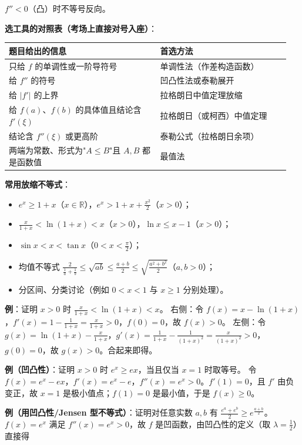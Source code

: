 \documentclass[11pt,openany,UTF8]{ctexbook}
\begin{document}
$f''<0$（凸）时不等号反向。

\textbf{选工具的对照表（考场上直接对号入座）}：

\begingroup\small\setlength{\tabcolsep}{4.0pt}
\begin{longtable}{@{}L{0.5058\linewidth}L{0.4399\linewidth}@{}}
\toprule
\textbf{题目给出的信息} & \textbf{首选方法} \\
\midrule
\endhead
只给 $f$ 的单调性或一阶导符号 & 单调性法（作差构造函数） \\
给 $f''$ 的符号 & 凹凸性法或泰勒展开 \\
给 $\vert f'\vert$ 的上界 & 拉格朗日中值定理放缩 \\
给 $f(a)$、$f(b)$ 的具体值且结论含 $f'(\xi)$ & 拉格朗日（或柯西）中值定理 \\
结论含 $f''(\xi)$ 或更高阶 & 泰勒公式（拉格朗日余项） \\
两端为常数、形式为"$A\le B$"且 $A,B$ 都是函数值 & 最值法 \\
\bottomrule
\end{longtable}
\endgroup

\textbf{常用放缩不等式}：

\begin{itemize}
\item $e^x\ge 1+x$（$x\in\mathbb R$），$e^x>1+x+\frac{x^2}{2}$（$x>0$）；
\item $\frac{x}{1+x}<\ln(1+x)<x$（$x>0$），$\ln x\le x-1$（$x>0$）；
\item $\sin x<x<\tan x$（$0<x<\frac\pi2$）；
\item 均值不等式 $\frac{2}{\frac1a+\frac1b}\le\sqrt{ab}\le\frac{a+b}{2}\le\sqrt{\frac{a^2+b^2}{2}}$（$a,b>0$）；
\item 分区间、分类讨论（例如 $0<x<1$ 与 $x\ge1$ 分别处理）。
\end{itemize}
\textbf{例}：证明 $x>0$ 时 $\frac{x}{1+x}<\ln(1+x)<x$。 右侧：令 $f(x)=x-\ln(1+x)$，$f'(x)=1-\frac{1}{1+x}=\frac{x}{1+x}>0$，$f(0)=0$，故 $f(x)>0$。 左侧：令 $g(x)=\ln(1+x)-\frac{x}{1+x}$，$g'(x)=\frac{1}{1+x}-\frac{1}{(1+x)^2}=\frac{x}{(1+x)^2}>0$，$g(0)=0$，故 $g(x)>0$。合起来即得。

\textbf{例（凹凸性）}：证明 $x>0$ 时 $e^x\ge ex$，当且仅当 $x=1$ 时取等号。 令 $f(x)=e^x-ex$，$f'(x)=e^x-e$，$f''(x)=e^x>0$。$f'(1)=0$，且 $f'$ 由负变正，故 $x=1$ 是极小值点；$f(1)=0$ 是最小值，于是 $f(x)\ge 0$。

\textbf{例（用凹凸性/Jensen 型不等式）}：证明对任意实数 $a,b$ 有 $\frac{e^a+e^b}{2}\ge e^{\frac{a+b}{2}}$。 $f(x)=e^x$ 满足 $f''(x)=e^x>0$，故 $f$ 是凹函数，由凹凸性的定义（取 $\lambda=\frac12$）直接得
\end{document}
